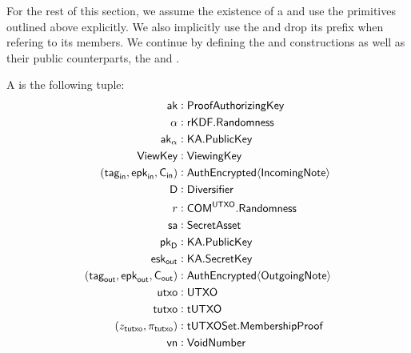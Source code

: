 For the rest of this section, we assume the existence of a \TransferConfiguration{} and use the primitives outlined above explicitly. We also implicitly use the \KeySchedule{} and drop its prefix when refering to its members. We continue by defining the \Sender{} and \Receiver{} constructions as well as their public counterparts, the \SenderPost{} and \ReceiverPost{}.

\begin{definition}
    A \Sender{} is the following tuple:
    \begin{align*}
        {\textsf{ak}}                       &: {\textsf{ProofAuthorizingKey}} \\
        \alpha                    &: {\textsf{rKDF}}.{\textsf{Randomness}} \\
        {\textsf{ak}}_\alpha                &: {\textsf{KA}}.{\textsf{PublicKey}} \\
        {\textsf{ViewKey}}                  &: {\textsf{ViewingKey}} \\
        ({{\textsf{tag}}_\textsf{in}}, {{\textsf{epk}}_\textsf{in}}, {\textsf{C}_\textsf{in}})    &: {\textsf{AuthEncrypted}}\langle{{\textsf{IncomingNote}}}\rangle \\
        \textsf{D}                &: {\textsf{Diversifier}} \\
        r                         &: {\textsf{COM}}^{\textsf{UTXO}}.{\textsf{Randomness}} \\
        {\textsf{sa}}                       &: {\textsf{SecretAsset}} \\
        {{\textsf{pk}}_\textsf{D}}                      &: {\textsf{KA}}.{\textsf{PublicKey}} \\
        {{\textsf{esk}}_{\textsf{out}}}                   &: {\textsf{KA}}.{\textsf{SecretKey}} \\
        ({{\textsf{tag}}_{\textsf{out}}}, {{\textsf{epk}}_{\textsf{out}}}, {\textsf{C}_\textsf{out}}) &: {\textsf{AuthEncrypted}}\langle{{\textsf{OutgoingNote}}}\rangle \\
        {\textsf{utxo}}                       &: {\textsf{UTXO}} \\
        {\textsf{tutxo}}                    &: {\textsf{tUTXO}} \\
        (z_{\textsf{tutxo}}, \pi_{\textsf{tutxo}})          &: {\textsf{tUTXOSet}}.{\textsf{MembershipProof}} \\
        {\textsf{vn}}                       &: {\textsf{VoidNumber}}
    \end{align*}


\end{definition}
